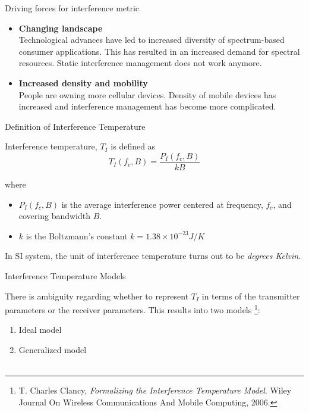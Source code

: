 \documentclass[mathserif]{beamer}
\begin{document}
\begin{frame}{Driving forces for interference metric}

\begin{itemize}
\pause
\item \textbf{Changing landscape} \\

Technological advances have led to increased diversity of spectrum-based consumer applications. This has resulted in an increased demand for spectral resources. Static interference management does not work anymore.

\pause
\item \textbf{Increased density and mobility} \\

People are owning more cellular devices. Density of mobile devices has increased and interference management has become more complicated.

\end{itemize}

\end{frame}


\begin{frame}{Definition of Interference Temperature}

Interference temperature, $T_I$ is defined as
\begin{equation*} 
    T_I(f_c , B) = \frac{P_I(f_c , B)}{kB}
\end{equation*}

where 

\begin{itemize}
	\item $P_I(f_c,B)$ is the average interference power centered at frequency, $f_c$, and covering bandwidth
$B$. 
	\item $k$ is the Boltzmann's constant $k = 1.38 \times 10^{-23} J/K $ 
\end{itemize}

\pause
In SI system, the unit of interference temperature turns out to be \emph{degrees Kelvin}.

\end{frame}



\begin{frame}{Interference Temperature Models}

There is ambiguity regarding whether to represent $T_I$ in terms of the transmitter parameters or the receiver parameters. This results into two models \footnote{T. Charles Clancy, \emph{Formalizing the Interference Temperature Model}. Wiley Journal On Wireless Communications And Mobile Computing, 2006.}:

\pause
\begin{enumerate}
    \item Ideal model
    \item Generalized model \\~\\
\end{enumerate}


\end{frame}
\end{document}
